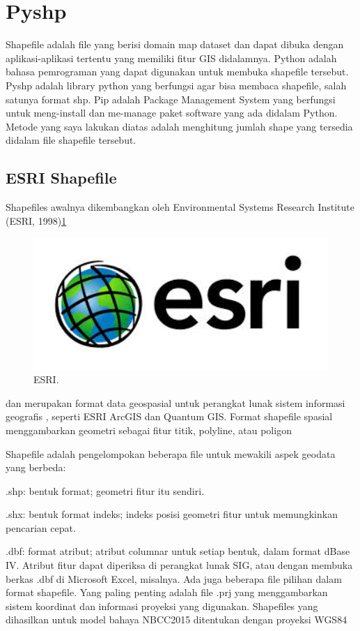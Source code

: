 
\section{Pyshp}
Shapefile adalah file yang berisi domain map dataset dan dapat dibuka dengan aplikasi-aplikasi tertentu yang memiliki fitur GIS didalamnya.
Python adalah bahasa pemrograman yang dapat digunakan untuk membuka shapefile tersebut.
Pyshp adalah library python yang berfungsi agar bisa membaca shapefile, salah satunya format shp.
Pip adalah Package Management System yang berfungsi untuk meng-install dan me-manage paket software yang ada didalam Python.
Metode yang saya lakukan diatas adalah menghitung jumlah shape yang tersedia didalam file shapefile tersebut.

\subsection{ESRI Shapefile}
	
Shapefiles awalnya dikembangkan oleh Environmental Systems Research Institute (ESRI, 1998)\ref{esri}
	\begin{figure}[ht]
	\centerline{\includegraphics[width=1\textwidth]{figures/esri.JPG}}
	\caption{ESRI.}
	\label{esri}
	\end{figure}dan merupakan format data geospasial untuk perangkat lunak sistem informasi geografis , seperti ESRI ArcGIS dan Quantum GIS\cite{halchuk2014fifth}.
	Format shapefile spasial menggambarkan geometri sebagai fitur titik, polyline, atau poligon

Shapefile adalah pengelompokan beberapa file untuk mewakili aspek geodata yang berbeda:
\item .shp: bentuk format; geometri fitur itu sendiri.
\item .shx: bentuk format indeks; indeks posisi geometri fitur untuk memungkinkan pencarian cepat.
\item .dbf: format atribut; atribut columnar untuk setiap bentuk, dalam format dBase IV.
Atribut fitur dapat diperiksa di perangkat lunak SIG, atau dengan membuka berkas .dbf di Microsoft Excel, misalnya. Ada juga beberapa file pilihan dalam format shapefile. Yang paling penting adalah file .prj yang menggambarkan sistem koordinat dan informasi proyeksi yang digunakan. Shapefiles yang dihasilkan untuk model bahaya NBCC2015 ditentukan dengan proyeksi WGS84

